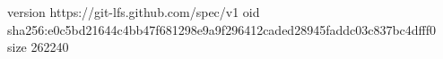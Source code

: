 version https://git-lfs.github.com/spec/v1
oid sha256:e0c5bd21644c4bb47f681298e9a9f296412caded28945faddc03c837bc4dfff0
size 262240
